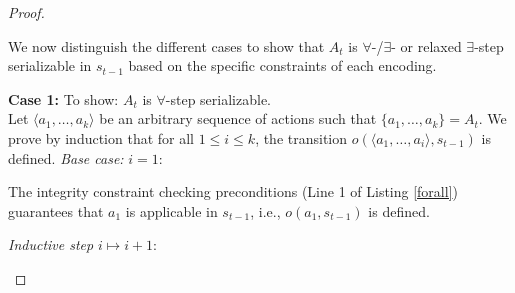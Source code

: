 \documentclass[
     11pt,                    %
     a4paper,             %
     BCOR=10mm,     %
     DIV=14,                 %
     listof=totoc,                    %
     bibliography=totoc,       %
     index=totoc,              %
     parskip            %
     twoside,
     headsepline
     ]{scrreprt}
\theoremstyle{definition}
\theoremstyle{definition}
\theoremstyle{remark}
\theoremstyle{bfnote}
\begin{document}
\begin{proof}
\begin{itemize}
      We now distinguish the different cases to show that $A_t$ is $\forall$-/$\exists$- or relaxed $\exists$-step serializable in $s_{t-1}$ based on the specific constraints of each encoding. \vspace{0.5em}

      \textbf{Case 1: } To show: $A_t$ is $\forall$-step serializable. \\
      Let $\langle a_1, \dots, a_k \rangle$ be an arbitrary sequence of actions such that $\{a_1, \dots, a_k\}=A_t$.
      We prove by induction that for all $1 \le i \le k$, the transition $o(\langle a_1, \dots, a_i \rangle, s_{t-1})$ is defined.
      \textit{Base case:} $i=1$: 

      The integrity constraint checking preconditions (Line 1 of Listing \ref{forall}) guarantees that $a_1$ is applicable in $s_{t-1}$, i.e., $o(a_1, s_{t-1})$ is defined. 

      \textit{Inductive step} $i \mapsto i+1$: 


\end{itemize}
\end{proof}
\end{document}
